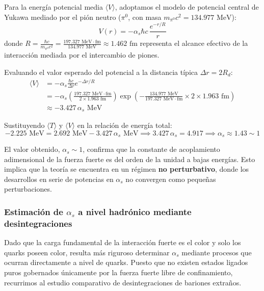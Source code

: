 Para la energía potencial media $\langle V \rangle$, adoptamos el modelo de potencial central de Yukawa mediado por el pión neutro ($\pi^0$, con masa $m_{\pi^0} c^2 = 134.977 \text{ MeV}$):
\begin{equation}
    V(r) = -\alpha_s \hbar c \, \frac{e^{-r/R}}{r}
\end{equation}
donde $R = \frac{\hbar c}{m_{\pi^0} c^2} = \frac{197.327 \text{ MeV}\cdot\text{fm}}{134.977 \text{ MeV}} \approx 1.462 \text{ fm}$ representa el alcance efectivo de la interacción mediada por el intercambio de piones.

Evaluando el valor esperado del potencial a la distancia típica $\Delta r = 2 R_d$:
\begin{align}
    \langle V \rangle &= -\alpha_s \frac{\hbar c}{\Delta r} e^{-\Delta r / R} \nonumber \\
    &= -\alpha_s \left( \frac{197.327 \text{ MeV}\cdot\text{fm}}{2 \times 1.963 \text{ fm}} \right) \exp\left( -\frac{134.977 \text{ MeV}}{197.327 \text{ MeV}\cdot\text{fm}} \times 2 \times 1.963 \text{ fm} \right) \nonumber \\
    &\approx -3.427 \, \alpha_s \text{ MeV}
\end{align}

Sustituyendo $\langle T \rangle$ y $\langle V \rangle$ en la relación de energía total:
\begin{equation}
    -2.225 \text{ MeV} = 2.692 \text{ MeV} - 3.427 \, \alpha_s \text{ MeV} \implies 3.427 \, \alpha_s = 4.917 \implies \alpha_s \approx 1.43 \sim 1
\end{equation}

El valor obtenido, $\alpha_s \sim 1$, confirma que la constante de acoplamiento adimensional de la fuerza fuerte es del orden de la unidad a bajas energías. Esto implica que la teoría se encuentra en un régimen \textbf{no perturbativo}, donde los desarrollos en serie de potencias en $\alpha_s$ no convergen como pequeñas perturbaciones.

\subsubsection*{Estimación de $\alpha_s$ a nivel hadrónico mediante desintegraciones}

Dado que la carga fundamental de la interacción fuerte es el color y solo los quarks poseen color, resulta más riguroso determinar $\alpha_s$ mediante procesos que ocurran directamente a nivel de quarks. Puesto que no existen estados ligados puros gobernados únicamente por la fuerza fuerte libre de confinamiento, recurrimos al estudio comparativo de desintegraciones de bariones extraños.

